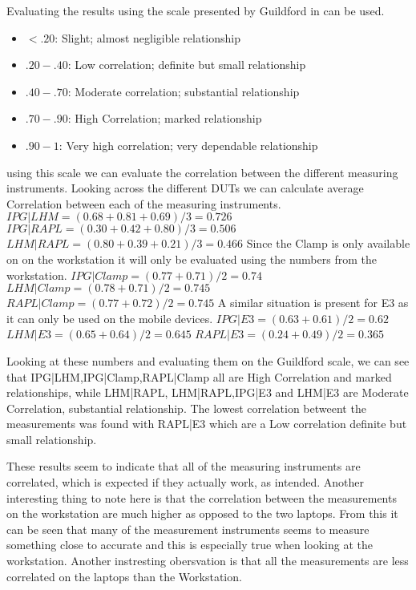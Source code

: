 % 
Evaluating the results using the scale presented by Guildford in \cite[219]{guilford1950fundamental} can be used.
\begin{itemize}
    \item $<.20$: Slight; almost negligible relationship
    \item $.20-.40$: Low correlation; definite but small relationship
    \item $.40-.70$: Moderate correlation; substantial relationship
    \item $.70-.90$: High Correlation; marked relationship
    \item $.90-1$: Very high correlation; very dependable relationship
\end{itemize}

using this scale we can evaluate the correlation between the different measuring instruments.
Looking across the different DUTs we can calculate average Correlation between each of the measuring instruments.
$IPG|LHM = (0.68+0.81+0.69)/3 = 0.726$
$IPG|RAPL = (0.30+0.42+0.80)/3 = 0.506$
$LHM|RAPL = (0.80+0.39+0.21)/3 = 0.466$
Since the Clamp is only available on on the workstation it will only be evaluated using the numbers from the workstation.
$IPG|Clamp = (0.77+0.71)/2 = 0.74$
$LHM|Clamp = (0.78+0.71)/2 = 0.745$
$RAPL|Clamp = (0.77+0.72)/2 = 0.745$
A similar situation is present for E3 as it can only be used on the mobile devices.
$IPG|E3 = (0.63+0.61)/2 = 0.62$
$LHM|E3 = (0.65+0.64)/2 = 0.645$
$RAPL|E3 = (0.24+0.49)/2 = 0.365$

Looking at these numbers and evaluating them on the Guildford scale, we can see that IPG|LHM,IPG|Clamp,RAPL|Clamp all are High Correlation and marked relationships, while LHM|RAPL, LHM|RAPL,IPG|E3 and LHM|E3 are Moderate Correlation, substantial relationship. The lowest correlation betweent the measurements was found with RAPL|E3 which are a Low correlation definite but small relationship.

These results seem to indicate that all of the measuring instruments are correlated, which is expected if they actually work, as intended. Another interesting thing to note here is that the correlation between the measurements on the workstation are much higher as opposed to the two laptops. From this it can be seen that many of the measurement instruments seems to measure something close to accurate and this is especially true when looking at the workstation. Another instresting obersvation is that all the measurements are less correlated on the laptops than the Workstation.




